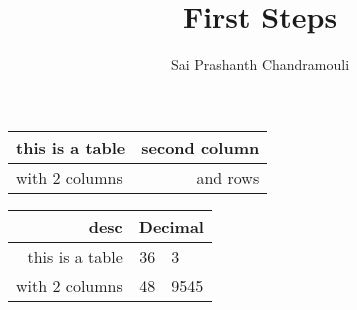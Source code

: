 \documentclass[a4paper,12pt,titlepage]{article} %
\author{Sai Prashanth Chandramouli}
\title{First Steps}
\begin{document}
	\begin{tabular}[t]{|p{36pt}|r|} %
		\hline
		this is a table & second column \\
		\hline
		with 2 columns & and rows \\
		\hline
	\end{tabular}
	
	\renewcommand{\arraystretch}{2} %
	\renewcommand{\tabcolsep}{0.4cm} %
	
	\begin{tabular}[c]{|r | r @{.} l |} 
		\hline
		desc & \multicolumn{2}{|c|}{Decimal} \\ %
		\hline
		this is a table & 36&3 \\
		\hline
		with 2 columns & 48&9545 \\
		\hline
	\end{tabular}
\end{document}
